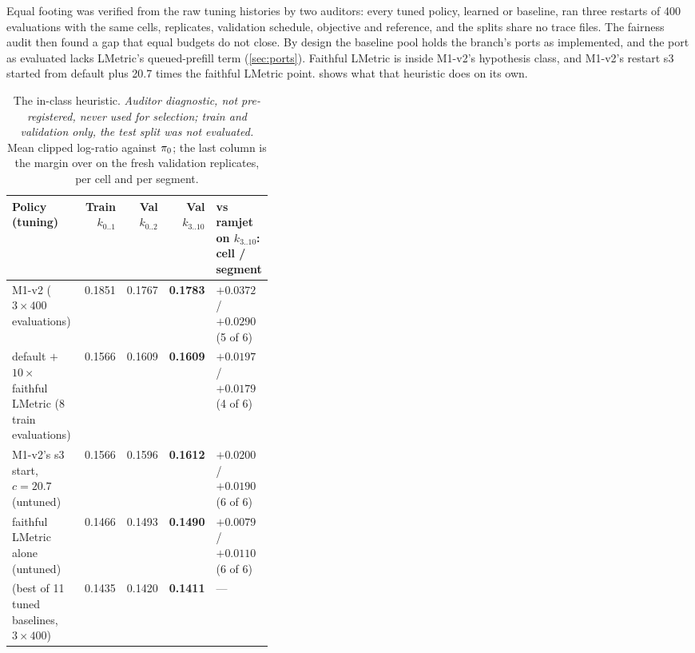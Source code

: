 Equal footing was verified from the raw tuning histories by two auditors: every tuned policy, learned
or baseline, ran three restarts of 400 evaluations with the same cells, replicates, validation
schedule, objective and reference, and the splits share no trace files. The fairness audit then found
a gap that equal budgets do not close. By design the baseline pool holds the branch's
ports as implemented, and the  port as evaluated lacks LMetric's queued-prefill term
(\cref{sec:ports}). Faithful LMetric is inside M1-v2's hypothesis class, and M1-v2's restart s3
started from default plus 20.7 times the faithful LMetric point.  shows what that
heuristic does on its own.

\begin{table}[tbp]
  \centering\small
  \caption{The in-class heuristic. \emph{Auditor diagnostic, not pre-registered, never used for
    selection; train and validation only, the test split was not evaluated.} Mean clipped
    log-ratio against $\piref$; the last column is the margin over  on the fresh
    validation replicates, per cell and per segment.}
  \label{tab:fairness}
  \begin{adjustbox}{max width=\linewidth}
  \begin{tabular}{@{}P{0.38\linewidth}rrrl@{}}
    \toprule
    Policy (tuning) & Train $k_{0..1}$ & Val $k_{0..2}$ & Val $k_{3..10}$ & vs ramjet on $k_{3..10}$: cell / segment \\
    \midrule
    M1-v2 ($3 \times 400$ evaluations) & 0.1851 & 0.1767 & \textbf{0.1783} & $+0.0372$ / $+0.0290$ (5 of 6) \\
    default $+$ $10\times$ faithful LMetric (8 train evaluations) & 0.1566 & 0.1609 & \textbf{0.1609} & $+0.0197$ / $+0.0179$ (4 of 6) \\
    M1-v2's s3 start, $c = 20.7$ (untuned) & 0.1566 & 0.1596 & \textbf{0.1612} & $+0.0200$ / $+0.0190$ (6 of 6) \\
    faithful LMetric alone (untuned) & 0.1466 & 0.1493 & \textbf{0.1490} & $+0.0079$ / $+0.0110$ (6 of 6) \\
     (best of 11 tuned baselines, $3 \times 400$) & 0.1435 & 0.1420 & \textbf{0.1411} & --- \\
    \bottomrule
  \end{tabular}
  \end{adjustbox}
\end{table}

